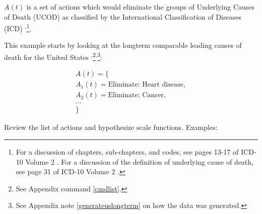 \documentclass[10pt, a4paper, twocolumn]{IEEEconf}
\newcommand\footnotesstartsep{\textsuperscript{,}}
\newcommand\footnotescontinue{\textsuperscript{,}}
\begin{document}
$A(t)$ is a set of actions which would eliminate the groups of Underlying Causes of Death (UCOD) as classified by the International Classification of Diseases (ICD) \citep{icd10vol1,icd10vol2,icd10vol3}\footnotesstartsep\footnote{For a discussion of chapters, sub-chapters, and codes, see pages 13-17 of ICD-10 Volume 2 \citep{icd10vol2}.
For a discussion of the definition of underlying cause of death, see page 31 of ICD-10 Volume 2 \citep{icd10vol2}.}.

This example starts by looking at the longterm comparable leading causes of death for the United States \citep{uslcod19001998,uspopulation19002001,centers2017underlying,nbermortality,censusestimates19001999}\footnotesstartsep\footnote{See Appendix command \ref{cmdlist}.}\footnotescontinue\footnote{See Appendix note \ref{generateuslongterm} on how the data was generated.}:

\begin{equation*}
  \begin{gathered}
    A(t) = \{\\
    A_1(t) = \textrm{Eliminate: Heart disease},\\
    A_2(t) = \textrm{Eliminate: Cancer},\\
    \textrm{\ldots}\\
    \}
  \end{gathered}
\end{equation*}

Review the list of actions and hypothesize scale functions. Examples:
\end{document}
